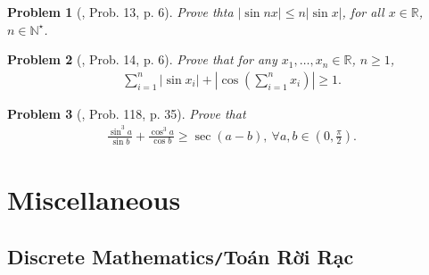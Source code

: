 \documentclass[oneside]{book}
\numberwithin{equation}{section}
\newtheorem{problem}{Problem}[section]
\begin{document}
\begin{problem}[\cite{Gelca_Andreescu2017}, Prob. 13, p. 6]
	Prove thta $|\sin nx|\le n|\sin x|$, for all $x\in\mathbb{R}$, $n\in\mathbb{N}^\star$.
\end{problem}

\begin{problem}[\cite{Gelca_Andreescu2017}, Prob. 14, p. 6]
	Prove that for any $x_1,\ldots,x_n\in\mathbb{R}$, $n\ge 1$,
	\begin{align*}
		\sum_{i=1}^n |\sin x_i| + \left|\cos\left(\sum_{i=1}^n x_i\right)\right|\ge 1.
	\end{align*}
\end{problem}

\begin{problem}[\cite{Gelca_Andreescu2017}, Prob. 118, p. 35]
	Prove that
	\begin{align*}
		\frac{\sin^3 a}{\sin b} + \frac{\cos^3 a}{\cos b}\ge\sec(a - b),\ \forall a,b\in\left(0,\frac{\pi}{2}\right).
	\end{align*}
\end{problem}


\chapter{Miscellaneous}

\section{Discrete Mathematics\texttt{/}Toán Rời Rạc}
\end{document}
